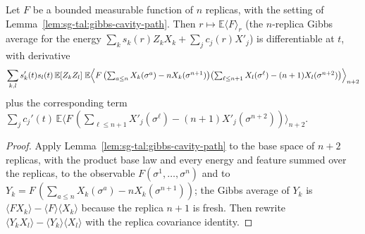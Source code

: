 \begin{theorem}\label{thm:sg-tal:gibbs-replica-cavity}
\leanok
{}
Let $F$ be a bounded measurable function of $n$ replicas, with the setting of Lemma~\ref{lem:sg-tal:gibbs-cavity-path}. Then $r\mapsto\mathbb E\langle F\rangle_r$ (the $n$-replica Gibbs average for the energy $\sum_ks_k(r)Z_kX_k+\sum_jc_j(r)X'_j$) is differentiable at $t$, with derivative
\[
\sum_{k,l}s_k'(t)s_l(t)\,\mathbb E[Z_kZ_l]\;\mathbb E\Bigl\langle F\,\bigl(\textstyle\sum_{a\le n}X_k(\sigma^a)-nX_k(\sigma^{n+1})\bigr)\bigl(\sum_{\ell\le n+1}X_l(\sigma^\ell)-(n+1)X_l(\sigma^{n+2})\bigr)\Bigr\rangle_{n+2}
\]
plus the corresponding term $\sum_jc_j'(t)\,\mathbb E\langle F\,(\sum_{\ell\le n+1}X'_j(\sigma^\ell)-(n+1)X'_j(\sigma^{n+2}))\rangle_{n+2}$.
\end{theorem}
\begin{proof}
\leanok
Apply Lemma~\ref{lem:sg-tal:gibbs-cavity-path} to the base space of $n+2$ replicas, with the product base law and every energy and feature summed over the replicas, to the observable $F(\sigma^1,\dots,\sigma^n)$ and to $Y_k=F\,(\sum_{a\le n}X_k(\sigma^a)-nX_k(\sigma^{n+1}))$; the Gibbs average of $Y_k$ is $\langle FX_k\rangle-\langle F\rangle\langle X_k\rangle$ because the replica $n+1$ is fresh. Then rewrite $\langle Y_kX_l\rangle-\langle Y_k\rangle\langle X_l\rangle$ with the replica covariance identity.
\end{proof}

